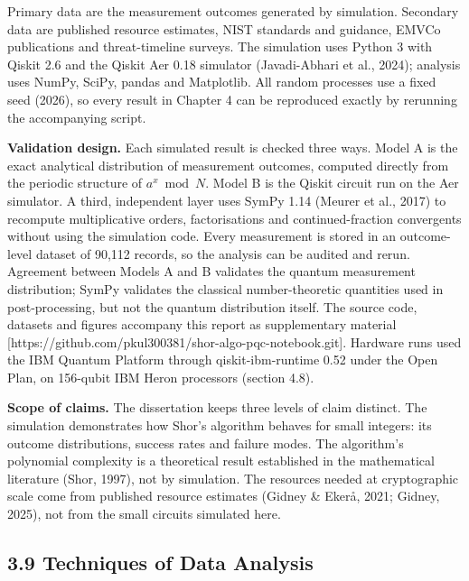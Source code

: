 \documentclass[12pt,oneside]{report}
\begin{document}
Primary data are the measurement outcomes generated by simulation. Secondary data are published resource estimates, NIST standards and guidance, EMVCo publications and threat-timeline surveys. The simulation uses Python 3 with Qiskit 2.6 and the Qiskit Aer 0.18 simulator (Javadi-Abhari et al., 2024); analysis uses NumPy, SciPy, pandas and Matplotlib. All random processes use a fixed seed (2026), so every result in Chapter 4 can be reproduced exactly by rerunning the accompanying script.
\par

\textbf{Validation design.} Each simulated result is checked three ways. Model A is the exact analytical distribution of measurement outcomes, computed directly from the periodic structure of $a^{x} \bmod N$. Model B is the Qiskit circuit run on the Aer simulator. A third, independent layer uses SymPy 1.14 (Meurer et al., 2017) to recompute multiplicative orders, factorisations and continued-fraction convergents without using the simulation code. Every measurement is stored in an outcome-level dataset of 90,112 records, so the analysis can be audited and rerun. Agreement between Models A and B validates the quantum measurement distribution; SymPy validates the classical number-theoretic quantities used in post-processing, but not the quantum distribution itself. The source code, datasets and figures accompany this report as supplementary material [https://github.com/pkul300381/shor-algo-pqc-notebook.git]. Hardware runs used the IBM Quantum Platform through qiskit-ibm-runtime 0.52 under the Open Plan, on 156-qubit IBM Heron processors (section 4.8).
\par

\textbf{Scope of claims.} The dissertation keeps three levels of claim distinct. The simulation demonstrates how Shor's algorithm behaves for small integers: its outcome distributions, success rates and failure modes. The algorithm's polynomial complexity is a theoretical result established in the mathematical literature (Shor, 1997), not by simulation. The resources needed at cryptographic scale come from published resource estimates (Gidney \& Ekerå, 2021; Gidney, 2025), not from the small circuits simulated here.
\par

\subsection*{3.9 Techniques of Data Analysis}
\end{document}
